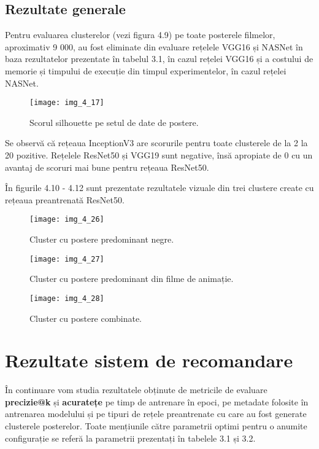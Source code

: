 \FloatBarrier
\subsection{Rezultate generale}
Pentru evaluarea clusterelor (vezi figura 4.9) pe toate posterele filmelor, aproximativ 9 000, au fost eliminate din evaluare rețelele VGG16 și NASNet în baza rezultatelor prezentate în tabelul 3.1, în cazul rețelei VGG16 și a costului de memorie și timpului de execuție din timpul experimentelor, în cazul rețelei NASNet.
\begin{figure}[!h]
	\centering
	\texttt{[image: img\_4\_17]}
	\caption[Scorul silhouette pe setul de date de postere]{Scorul silhouette pe setul de date de postere.}
\end{figure} 
Se observă că rețeaua InceptionV3 are scorurile pentru toate clusterele de la 2 la 20 pozitive. Rețelele ResNet50 și VGG19 sunt negative, însă apropiate de 0 cu un avantaj de scoruri mai bune pentru rețeaua ResNet50.

În figurile 4.10 - 4.12 sunt prezentate rezultatele vizuale din trei clustere create cu rețeaua preantrenată ResNet50.
\begin{figure}[!h]
	\centering
	\texttt{[image: img\_4\_26]}
	\caption[Cluster cu postere predominant negre]{Cluster cu postere predominant negre.}
\end{figure} 
\begin{figure}[!h]
	\centering
	\texttt{[image: img\_4\_27]}
	\caption[Cluster cu postere predominant din filme de animație]{Cluster cu postere predominant din filme de animație.}
\end{figure} 
\begin{figure}[!h]
	\centering
	\texttt{[image: img\_4\_28]}
	\caption[Cluster cu postere combinate]{Cluster cu postere combinate.}
\end{figure} 

\section{Rezultate sistem de recomandare}
În continuare vom studia rezultatele obținute de metricile de evaluare \textbf{precizie@k} și \textbf{acuratețe} pe timp de antrenare în epoci, pe metadate folosite în antrenarea modelului și pe tipuri de rețele preantrenate cu care au fost generate clusterele posterelor. Toate mențiunile către parametrii optimi pentru o anumite configurație se referă la parametrii prezentați în tabelele 3.1 și 3.2.

